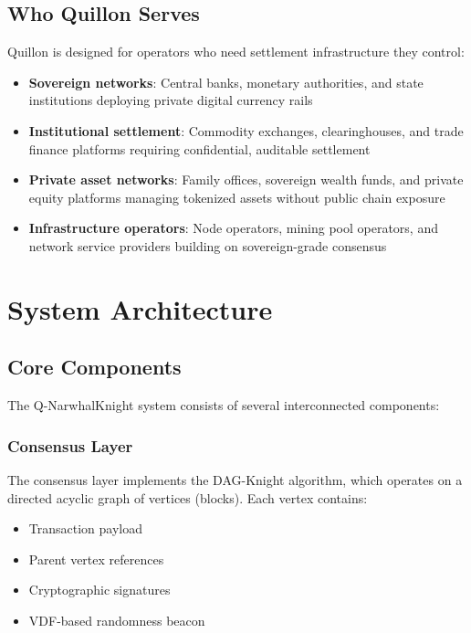 \documentclass[11pt,a4paper]{article}
\begin{document}
\subsection{Who Quillon Serves}

Quillon is designed for operators who need settlement infrastructure they control:

\begin{itemize}
    \item \textbf{Sovereign networks}: Central banks, monetary authorities, and state institutions deploying private digital currency rails
    \item \textbf{Institutional settlement}: Commodity exchanges, clearinghouses, and trade finance platforms requiring confidential, auditable settlement
    \item \textbf{Private asset networks}: Family offices, sovereign wealth funds, and private equity platforms managing tokenized assets without public chain exposure
    \item \textbf{Infrastructure operators}: Node operators, mining pool operators, and network service providers building on sovereign-grade consensus
\end{itemize}

\section{System Architecture}

\subsection{Core Components}

The Q-NarwhalKnight system consists of several interconnected components:

\subsubsection{Consensus Layer}
The consensus layer implements the DAG-Knight algorithm, which operates on a directed acyclic graph of vertices (blocks). Each vertex contains:
\begin{itemize}
    \item Transaction payload
    \item Parent vertex references
    \item Cryptographic signatures
    \item VDF-based randomness beacon
\end{itemize}
\end{document}
